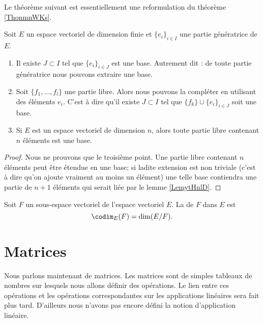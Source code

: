 Le théorème suivant est essentiellement une reformulation du théorème \ref{ThonmnWKs}.
\begin{theorem} \label{ThoBaseIncompjblieG}     \label{ThoMGQZooIgrXjy}
    Soit \( E\) un espace vectoriel de dimension finie et \( \{ e_i \}_{i\in I}\) une partie génératrice de \( E\).

    \begin{enumerate}
        \item
            Il existe \( J\subset I\) tel que \( \{ e_i \}_{i\in J}\) est une base. Autrement dit : de toute partie génératrice nous pouvons extraire une base.
        \item
            Soit \( \{ f_1,\ldots, f_l \}\) une partie libre. Alors nous pouvons la compléter en utilisant des éléments \( e_i\). C'est à dire qu'il existe \( J\subset I\) tel que \( \{ f_k \}\cup\{ e_i \}_{i\in J}\) soit une base.
        \item       \label{ItemHIVAooPnTlsBi}
            Si \( E\) est un espace vectoriel de dimension \( n\), alors toute partie libre contenant \( n\) éléments est une base.
    \end{enumerate}
\end{theorem}

\begin{proof}
    Nous ne prouvons que le troisième point. Une partie libre contenant \( n\) éléments peut être étendue en une base; si ladite extension est non triviale (c'est à dire qu'on ajoute vraiment au moins un élément) une telle base contiendra une partie de \( n+1\) éléments qui serait liée par le lemme \ref{LemytHnlD}.
\end{proof}

Soit \( F\) un sous-espace vectoriel de l'espace vectoriel \( E\). La  de \( F\) dans \( E\) est
\begin{equation}
    \codim_E(F)=\dim(E/F).
\end{equation}

\section{Matrices}

Nous parlons maintenant de matrices. Les matrices sont de simples tableaux de nombres sur lesquels nous allons définir des opérations. Le lien entre ces opérations et les opérations correspondantes sur les applications linéaires sera fait plus tard. D'ailleurs nous n'avons pas encore défini la notion d'application linéaire.

